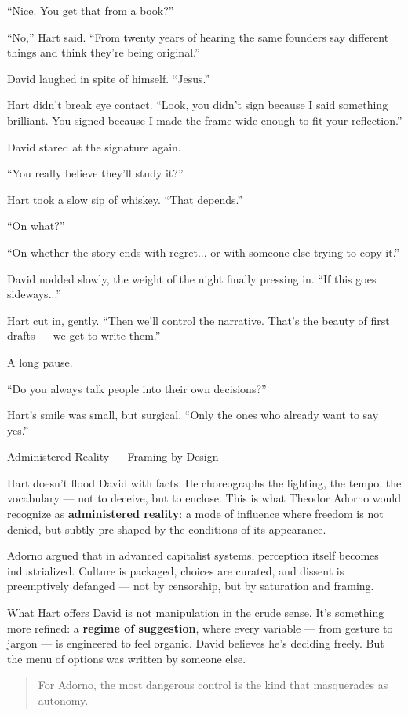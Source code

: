``Nice. You get that from a book?''

``No,'' Hart said. ``From twenty years of hearing the same founders say different things and think they’re being 
original.''

David laughed in spite of himself. ``Jesus.''

Hart didn’t break eye contact. ``Look, you didn’t sign because I said something brilliant. You signed because 
I made the frame wide enough to fit your reflection.''

David stared at the signature again.

``You really believe they’ll study it?''

Hart took a slow sip of whiskey. ``That depends.''

``On what?''

``On whether the story ends with regret... or with someone else trying to copy it.''

David nodded slowly, the weight of the night finally pressing in. ``If this goes sideways...''

Hart cut in, gently. ``Then we’ll control the narrative. That’s the beauty of first drafts — we get to write them.''

A long pause.

``Do you always talk people into their own decisions?''

Hart’s smile was small, but surgical. ``Only the ones who already want to say yes.''

\medskip

\begin{PsychologicalSidebar}{Administered Reality --- Framing by Design}

    Hart doesn’t flood David with facts. He choreographs the lighting, the tempo, the vocabulary — not to deceive, 
    but to enclose. This is what Theodor Adorno would recognize as \textbf{administered reality}:  
    a mode of influence where freedom is not denied, but subtly pre-shaped by the conditions of its appearance.
    
    \medskip
    
    Adorno argued that in advanced capitalist systems, perception itself becomes industrialized. Culture is packaged, 
    choices are curated, and dissent is preemptively defanged — not by censorship, but by saturation and framing.
    
    \medskip
    
    What Hart offers David is not manipulation in the crude sense. It’s something more refined:  
    a \textbf{regime of suggestion}, where every variable --- from gesture to jargon --- is engineered to feel organic.  
    David believes he’s deciding freely. But the menu of options was written by someone else.
    
    \begin{quote}
    For Adorno, the most dangerous control  
    is the kind that masquerades as autonomy.
    \end{quote}
    
    \end{PsychologicalSidebar}
    


